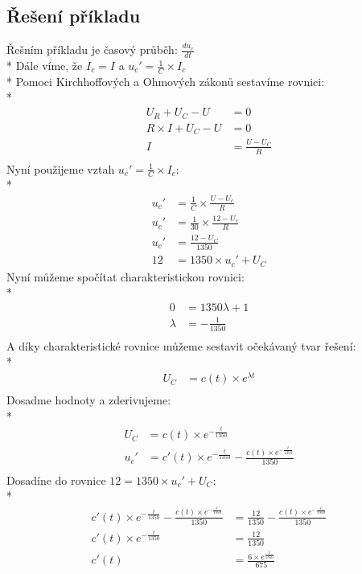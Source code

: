 \documentclass[a4paper, 10pt, fleqn]{article}
\begin{document}
\subsection*{Řešení příkladu}
Řešním příkladu je časový průběh: $\frac{du_{c}}{dt}$ \\*
Dále víme, že $I_{c} = I$ a ${u_{c}'} = \frac{1}{C} \times I_{c}$ \\*
Pomoci Kirchhoffových a Ohmových zákonů sestavíme rovnici: \\*
\begin{align*}
 U_{R} + U_{C} - U &= 0 \\
 R \times I + U_{C} - U &= 0 \\
 I &= \frac{U - U_{C}}{R} \\
\end{align*}
Nyní použijeme vztah ${u_{c}'} = \frac{1}{C} \times I_{c}$: \\*
\begin{align*}
 {u_{c}'} &= \frac{1}{C} \times \frac{U - U_{c}}{R} \\
 {u_{c}'} &= \frac{1}{30} \times \frac{12 - U_{c}}{R} \\
 {u_{c}'} &= \frac{12 - U_{C}}{1350} \\
 12 &= 1350 \times {u_{c}'} + U_{C}
\end{align*}
Nyní můžeme spočítat charakteristickou rovnici: \\*
\begin{align*}
 0 &= 1350\lambda + 1 \\
 \lambda &= -\frac{1}{1350} \\
\end{align*}
A díky charakteristické rovnice můžeme sestavit očekávaný tvar řešení:\\*
\begin{align*}
 U_{C} &=c(t) \times e^{\lambda t} \\
\end{align*}
Dosadme hodnoty a zderivujeme: \\*
\begin{align*}
 U_{C} &=c(t) \times e^{-\frac{t}{1350}} \\
 {u_{c}'} &= {c'(t)} \times e^{-\frac{t}{1350}} - \frac{c(t) \times e^{-\frac{t}{1350}}}{1350} \\
\end{align*}
Dosadíne do rovnice $12 = 1350 \times {u_{c}'} + U_{C}$: \\*
\begin{align*}
 {c'(t)} \times e^{-\frac{t}{1350}} - \frac{c(t) \times e^{-\frac{t}{1350}}}{1350} &= \frac{12}{1350} - \frac{c(t) \times e^{-\frac{t}{1350}}}{1350} \\
 {c'(t)} \times e^{-\frac{t}{1350}} &= \frac{12}{1350} \\
 {c'(t)} &= \frac{6 \times e^{\frac{t}{1350}}}{675} \\
\end{align*}
\end{document}
